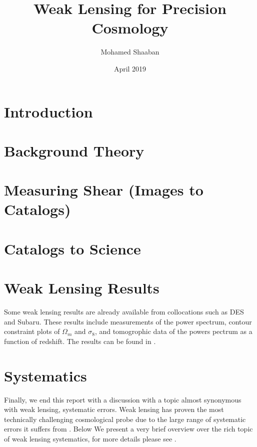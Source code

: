 \documentclass{article}
\title{Weak Lensing for Precision Cosmology}
\author{Mohamed Shaaban}
\date{April 2019}
\begin{document}
\maketitle

\section{Introduction}


\section{Background Theory}



\section{Measuring Shear (Images to Catalogs)}


\section{Catalogs to Science}


\section{Weak Lensing Results}
Some weak lensing results are already available from collocations such as DES and Subaru. These results include measurements of the power spectrum, contour constraint plots of $\Omega_m$ and $\sigma_8$, and tomogrophic data of the powers pectrum as a function of redshift. The results can be found in \cite{Subaru_2019}.

\section{Systematics}
Finally, we end this report with a discussion with a topic almost synonymous with weak lensing, systematic errors. Weak lensing has proven the most technically challenging cosmological probe due to the large range of systematic errors it suffers from \cite{general_2013}. Below We present a very brief overview over the rich topic of weak lensing systematics, for more details please see \cite{massey_2013,general_2013}.
\end{document}
